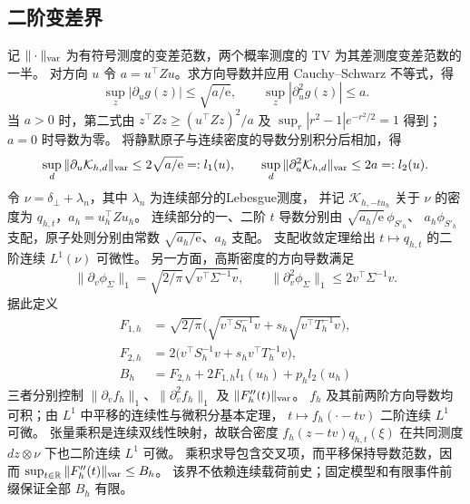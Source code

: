 \subsection{二阶变差界}
记 $\|\cdot\|_{\rm var}$ 为有符号测度的变差范数，两个概率测度的 TV 为其差测度变差范数的一半。
对方向 $u$ 令 $a=u^\top Zu$。求方向导数并应用 Cauchy--Schwarz 不等式，得
\begin{equation}
 \sup_z|\partial_u g(z)|\le\sqrt{a/\mathrm e},\qquad
 \sup_z|\partial_u^2g(z)|\le a.
\end{equation}
当 $a>0$ 时，第二式由 $z^\top Zz\ge(u^\top Zz)^2/a$ 及
$\sup_r|r^2-1|e^{-r^2/2}=1$ 得到；$a=0$ 时导数为零。
将静默原子与连续密度的导数分别积分后相加，得
\begin{equation}
 \sup_d\|\partial_u\mathcal K_{h,d}\|_{\rm var}\le2\sqrt{a/\mathrm e}=:l_1(u),\qquad
 \sup_d\|\partial_u^2\mathcal K_{h,d}\|_{\rm var}\le2a=:l_2(u).
 \label{eq:kernel-derivatives}
\end{equation}
令 $\nu=\delta_\bot+\lambda_n$，其中 $\lambda_n$ 为连续部分的Lebesgue测度，
并记 $\mathcal K_{h,-tu_h}$ 关于 $\nu$ 的密度为 $q_{h,t}$，$a_h=u_h^\top Zu_h$。
连续部分的一、二阶 $t$ 导数分别由 $\sqrt{a_h/\mathrm e}\,\phi_{S'_h}$、
$a_h\phi_{S'_h}$ 支配，原子处则分别由常数 $\sqrt{a_h/\mathrm e}$、$a_h$ 支配。
支配收敛定理给出 $t\mapsto q_{h,t}$ 的二阶连续 $L^1(\nu)$ 可微性。
另一方面，高斯密度的方向导数满足
\begin{equation}
 \|\partial_v\phi_\Sigma\|_1=\sqrt{2/\pi}\sqrt{v^\top\Sigma^{-1}v},\qquad
 \|\partial_v^2\phi_\Sigma\|_1\le2v^\top\Sigma^{-1}v.
\end{equation}
据此定义
\begin{equation}
 \begin{aligned}
 F_{1,h}&=\sqrt{2/\pi}\big(\sqrt{v^\top S_h^{-1}v}+s_h\sqrt{v^\top T_h^{-1}v}\big),\\
 F_{2,h}&=2\big(v^\top S_h^{-1}v+s_hv^\top T_h^{-1}v\big),\\
 B_h&=F_{2,h}+2F_{1,h}l_1(u_h)+p_hl_2(u_h)
 \end{aligned}
 \label{eq:Bh}
\end{equation}
三者分别控制 $\|\partial_v f_h\|_1$、$\|\partial_v^2f_h\|_1$ 及 $\|F_h''(t)\|_{\rm var}$。
$f_h$ 及其前两阶方向导数均可积；由 $L^1$ 中平移的连续性与微积分基本定理，
$t\mapsto f_h(\cdot-tv)$ 二阶连续 $L^1$ 可微。
张量乘积是连续双线性映射，故联合密度
$f_h(z-tv)q_{h,t}(\xi)$ 在共同测度 $dz\otimes\nu$ 下也二阶连续 $L^1$ 可微。
乘积求导包含交叉项，而平移保持导数范数，因而
$\sup_{t\in\mathbb R}\|F_h''(t)\|_{\rm var}\le B_h$。
该界不依赖连续载荷前史；固定模型和有限事件前缀保证全部 $B_h$ 有限。

